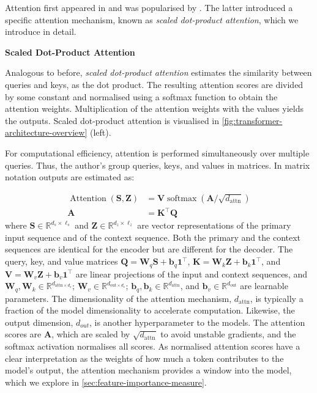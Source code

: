 Attention first appeared in \textcite[][4]{bahdanauNeuralMachineTranslation2016} and was popularised by \textcite[][4]{vaswaniAttentionAllYou2017}. The latter introduced a specific attention mechanism, known as \emph{scaled dot-product attention}, which we introduce in detail.

\textbf{Scaled Dot-Product Attention}

Analogous to before, \emph{scaled dot-product attention} estimates the similarity between queries and keys, as the dot product. The resulting attention scores are divided by some constant and normalised using a softmax function to obtain the attention weights. Multiplication of the attention weights with the values yields the outputs. Scaled dot-product attention is visualised in \cref{fig:transformer-architecture-overview} (left).

For computational efficiency, attention is performed simultaneously over multiple queries. Thus, the author's group queries, keys, and values in matrices. In matrix notation outputs are estimated as:

\begin{equation}
    \begin{aligned}
        \operatorname{Attention}(\mathbf{S},\mathbf{Z}) & = \mathbf{V} \operatorname{softmax}\left(\mathbf{A} / \sqrt{d_{\mathrm{attn}}}\right) \\
        \mathbf{A}                                      & = \mathbf{K}^{\top} \mathbf{Q}
    \end{aligned}
    \label{eq:attention}
\end{equation}
where $\mathbf{S} \in \mathbb{R}^{d_s \times \ell_s}$ and $\mathbf{Z} \in \mathbb{R}^{d_z \times \ell_z}$ are vector representations of the primary input sequence and of the context sequence. Both the primary and the context sequences are identical for the encoder but are different for the decoder. The query, key, and value matrices $\mathbf{Q}=\mathbf{W}_q \mathbf{S} + \mathbf{b}_q\mathbf{1}^{\top}$, $\mathbf{K}=\mathbf{W}_k \mathbf{Z} + \mathbf{b}_k\mathbf{1}^{\top}$, and $\mathbf{V}=\mathbf{W}_v \mathbf{Z} + \mathbf{b}_v\mathbf{1}^{\top}$ are linear projections of the input and context sequences, and $\mathbf{W}_q, \mathbf{W}_k \in \mathbb{R}^{d_{\mathrm{attn}\times d_{s}}}$; $\mathbf{W}_v \in \mathbb{R}^{d_{\mathrm{out}\times d_{z}}}$; $\mathbf{b}_q, \mathbf{b}_k \in \mathbb{R}^{d_{\mathrm{attn}}}$, and $\mathbf{b}_v \in \mathbb{R}^{d_{\mathrm{out}}}$ are learnable parameters. The dimensionality of the attention mechanism, $d_{\mathrm{attn}}$, is typically a fraction of the model dimensionality to accelerate computation. Likewise, the output dimension, $d_{out}$, is another hyperparameter to the models. The attention scores are $\mathbf{A}$, which are scaled by $\sqrt{d_{\mathrm{attn}}}$ to avoid unstable gradients, and the softmax activation normalises all scores. As normalised attention scores have a clear interpretation as the weights of how much a token contributes to the model's output, the attention mechanism provides a window into the model, which we explore in \cref{sec:feature-importance-measure}.

